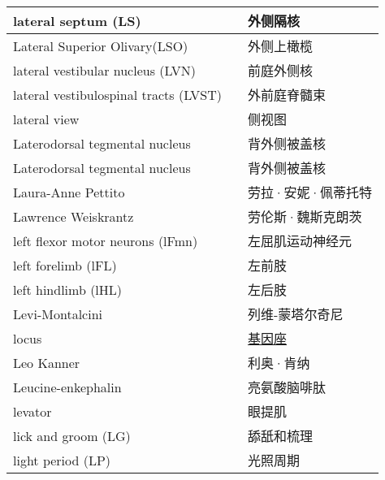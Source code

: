 \begin{longtable}{lll}
	\midrule
	lateral septum (LS)  && 外侧隔核  \\
	
	\midrule
	Lateral Superior Olivary(LSO)   && 外侧上橄榄  \\
	
	\midrule
	lateral vestibular nucleus (LVN)  && 前庭外侧核  \\
	
	\midrule
	lateral vestibulospinal tracts (LVST)  && 外前庭脊髓束  \\
	
	\midrule
	lateral view   && 侧视图  \\
	
	\midrule
	Laterodorsal tegmental nucleus   && 背外侧被盖核  \\
	
	\midrule
	Laterodorsal tegmental nucleus   && 背外侧被盖核  \\
	
	\midrule
	Laura-Anne Pettito   && 劳拉·安妮·佩蒂托特  \\
	
	\midrule
	Lawrence Weiskrantz   && 劳伦斯·魏斯克朗茨  \\
	
	\midrule
	left flexor motor neurons (lFmn)   && 左屈肌运动神经元  \\
	
	\midrule
	left forelimb (lFL)   && 左前肢  \\
	
	\midrule
	left hindlimb (lHL)   && 左后肢  \\
	
	\midrule
	Levi-Montalcini   && 列维-蒙塔尔奇尼  \\
	
	\midrule
	locus   && \href{https://baike.baidu.com/item/Locus/1628923}{基因座}  \\
	
	\midrule
	Leo Kanner   && 利奥·肯纳  \\
	
	\midrule
	Leucine-enkephalin   && 亮氨酸脑啡肽  \\
	
	\midrule
	levator   && 眼提肌  \\
	
	\midrule
	lick and groom (LG)  && 舔舐和梳理  \\
	
	\midrule
	light period (LP)  && 光照周期  \\
	

\end{longtable}
